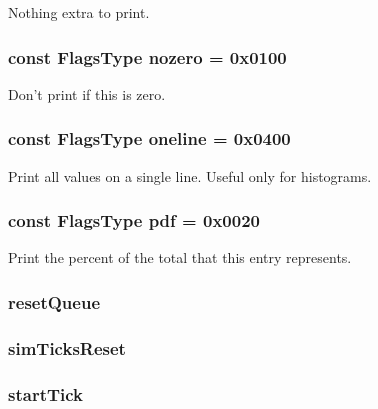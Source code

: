 \label{namespaceStats_adaca029bee6973514c46aa649f669b21}
Nothing extra to print. \hypertarget{namespaceStats_aea66fede55fadabd06c458fb36736378}{
\subsubsection[{nozero}]{\setlength{\rightskip}{0pt plus 5cm}const {\bf FlagsType} {\bf nozero} = 0x0100}}
\label{namespaceStats_aea66fede55fadabd06c458fb36736378}
Don't print if this is zero. \hypertarget{namespaceStats_a924518f4adce022c20ffa8ae5540e6d4}{
\subsubsection[{oneline}]{\setlength{\rightskip}{0pt plus 5cm}const {\bf FlagsType} {\bf oneline} = 0x0400}}
\label{namespaceStats_a924518f4adce022c20ffa8ae5540e6d4}
Print all values on a single line. Useful only for histograms. \hypertarget{namespaceStats_a148700bbb7b09b1ebb9d6b099155391a}{
\subsubsection[{pdf}]{\setlength{\rightskip}{0pt plus 5cm}const {\bf FlagsType} {\bf pdf} = 0x0020}}
\label{namespaceStats_a148700bbb7b09b1ebb9d6b099155391a}
Print the percent of the total that this entry represents. \hypertarget{namespaceStats_a9d87f9de7107952b482c01c37e2b9598}{
\subsubsection[{resetQueue}]{ {\bf resetQueue}}}
\label{namespaceStats_a9d87f9de7107952b482c01c37e2b9598}
\hypertarget{namespaceStats_a3862efc82a7c55339d294adab97b3350}{
\subsubsection[{simTicksReset}]{ {\bf simTicksReset}}}
\label{namespaceStats_a3862efc82a7c55339d294adab97b3350}
\hypertarget{namespaceStats_abb5b9a49cfd474709a39c1133a1cabba}{
\subsubsection[{startTick}]{ {\bf startTick}}}
